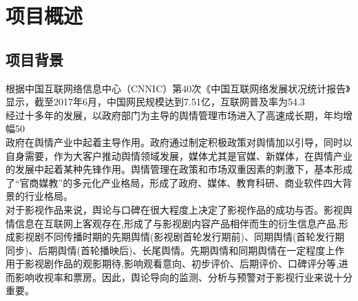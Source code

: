 \section{项目概述}

\subsection{项目背景}
    根据中国互联网络信息中心（CNNIC）第40次《中国互联网络发展状况统计报告》显示，截至2017年6月，中国网民规模达到7.51亿，互联网普及率为54.3%
 \\经过十多年的发展，以政府部门为主导的舆情管理市场进入了高速成长期，年均增幅50%
 \\政府在舆情产业中起着主导作用。政府通过制定积极政策对舆情加以引导，同时以自身需要，作为大客户推动舆情领域发展，媒体尤其是官媒、新媒体，在舆情产业的发展中起着某种先锋作用。舆情管理在政策和市场双重因素的刺激下，基本形成了“官商媒教”的多元化产业格局，形成了政府、媒体、教育科研、商业软件四大背景的行业格局。
 \\对于影视作品来说，舆论与口碑在很大程度上决定了影视作品的成功与否。影视舆情信息在互联网上客观存在,形成了与影视剧内容产品相伴而生的衍生信息产品,形成影视剧不同传播时期的先期舆情(影视剧首轮发行期前)、同期舆情(首轮发行期同步)、后期舆情(首轮播映后)、长尾舆情。先期舆情和同期舆情在一定程度上作用于影视剧作品的观影期待,影响观看意向、初步评价、后期评价、口碑评分等,进而影响收视率和票房。因此，舆论导向的监测、分析与预警对于影视行业来说十分重要。

